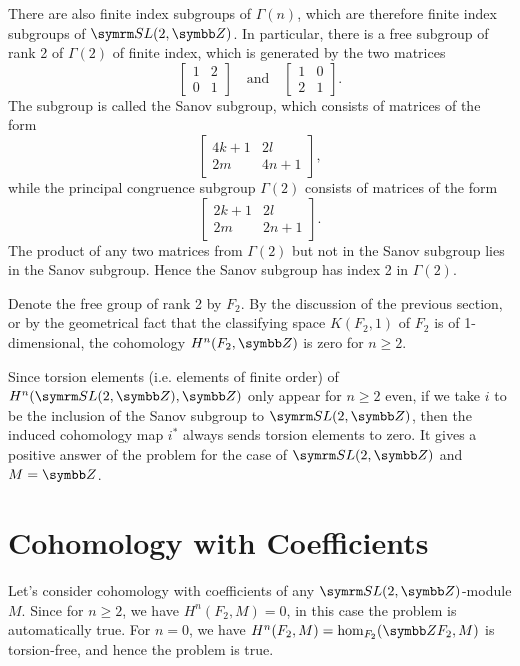 There are also finite index subgroups of $\Gamma(n)$, which are therefore finite index subgroups of $\SLtZ$. In particular, there is a free subgroup of rank 2 of $\Gamma(2)$ of finite index, which is generated by the two matrices
\begin{equation*}
  \begin{bmatrix}
    1 & 2\\ 0 & 1
  \end{bmatrix}
  \quad\text{and}\quad
  \begin{bmatrix}
    1 & 0\\ 2 & 1
  \end{bmatrix}.
\end{equation*}
The subgroup is called the Sanov subgroup, which consists of matrices of the form
\begin{equation*}
  \begin{bmatrix}
    4k+1&2l\\2m&4n+1
  \end{bmatrix},
\end{equation*}
while the principal congruence subgroup $\Gamma(2)$ consists of matrices of the form
\begin{equation*}
  \begin{bmatrix}
    2k+1&2l\\2m&2n+1
  \end{bmatrix}.
\end{equation*}
The product of any two matrices from $\Gamma(2)$ but not in the Sanov subgroup lies in the Sanov subgroup. Hence the Sanov subgroup has index 2 in $\Gamma(2)$.

Denote the free group of rank 2 by $F_2$. By the discussion of the previous section, or by the geometrical fact that the classifying space $K(F_2, 1)$ of $F_2$ is of 1-dimensional, the cohomology $H^n(F_2, \ZZ)$ is zero for $n\geq 2$.

Since torsion elements (i.e. elements of finite order) of $H^n(\SLtZ, \ZZ)$ only appear for $n\geq 2$ even, if we take $i$ to be the inclusion of the Sanov subgroup to $\SLtZ$, then the induced cohomology map $i^*$ always sends torsion elements to zero. It gives a positive answer of the problem for the case of $\SLtZ$ and $M=\ZZ$.

\section{Cohomology with Coefficients}

Let's consider cohomology with coefficients of any $\SLtZ$-module $M$. Since for $n\geq 2$, we have $H^n(F_2, M)=0$, in this case the problem is automatically true. For $n=0$, we have $H^n(F_2, M) = \hom_{F_2}(\ZZ F_2, M)$ is torsion-free, and hence the problem is true.

